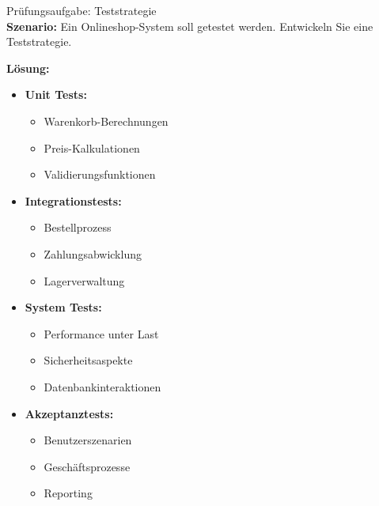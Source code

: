 \begin{example2}{Prüfungsaufgabe: Teststrategie}\\
\textbf{Szenario:}
Ein Onlineshop-System soll getestet werden. Entwickeln Sie eine Teststrategie.

\textbf{Lösung:}
\begin{itemize}
    \item \textbf{Unit Tests:}
    \begin{itemize}
        \item Warenkorb-Berechnungen
        \item Preis-Kalkulationen
        \item Validierungsfunktionen
    \end{itemize}
    
    \item \textbf{Integrationstests:}
    \begin{itemize}
        \item Bestellprozess
        \item Zahlungsabwicklung
        \item Lagerverwaltung
    \end{itemize}
    
    \item \textbf{System Tests:}
    \begin{itemize}
        \item Performance unter Last
        \item Sicherheitsaspekte
        \item Datenbankinteraktionen
    \end{itemize}
    
    \item \textbf{Akzeptanztests:}
    \begin{itemize}
        \item Benutzerszenarien
        \item Geschäftsprozesse
        \item Reporting
    \end{itemize}
\end{itemize}
\end{example2}


